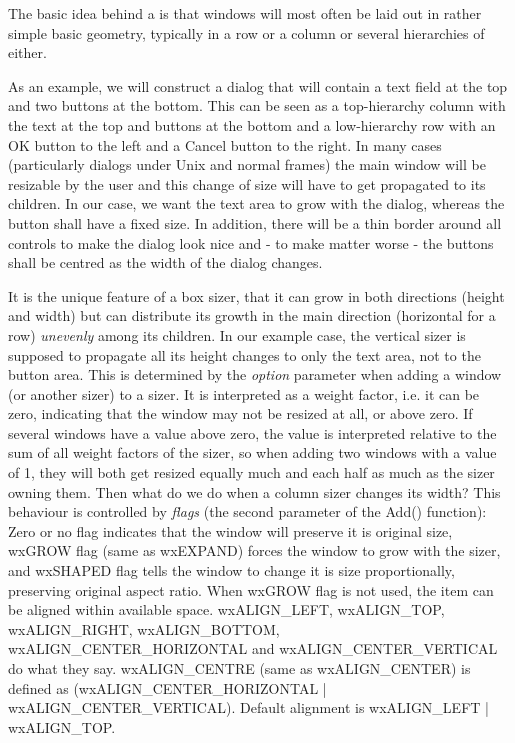 The basic idea behind a  is that windows will most often be laid out in rather
simple basic geometry, typically in a row or a column or several hierarchies of either.

As an example, we will construct a dialog that will contain a text field at the top and
two buttons at the bottom. This can be seen as a top-hierarchy column with the text at
the top and buttons at the bottom and a low-hierarchy row with an OK button to the left
and a Cancel button to the right. In many cases (particularly dialogs under Unix and
normal frames) the main window will be resizable by the user and this change of size
will have to get propagated to its children. In our case, we want the text area to grow
with the dialog, whereas the button shall have a fixed size. In addition, there will be
a thin border around all controls to make the dialog look nice and - to make matter worse -
the buttons shall be centred as the width of the dialog changes.

It is the unique feature of a box sizer, that it can grow in both directions (height and
width) but can distribute its growth in the main direction (horizontal for a row) {\it unevenly} 
among its children. In our example case, the vertical sizer is supposed to propagate all its
height changes to only the text area, not to the button area. This is determined by the {\it option} parameter
when adding a window (or another sizer) to a sizer. It is interpreted
as a weight factor, i.e. it can be zero, indicating that the window may not be resized
at all, or above zero. If several windows have a value above zero, the value is interpreted
relative to the sum of all weight factors of the sizer, so when adding two windows with
a value of 1, they will both get resized equally much and each half as much as the sizer
owning them. Then what do we do when a column sizer changes its width? This behaviour is
controlled by {\it flags} (the second parameter of the Add() function): Zero or no flag
indicates that the window will preserve it is original size, wxGROW flag (same as wxEXPAND)
forces the window to grow with the sizer, and wxSHAPED flag tells the window to change it is
size proportionally, preserving original aspect ratio.  When wxGROW flag is not used,
the item can be aligned within available space.  wxALIGN\_LEFT, wxALIGN\_TOP, wxALIGN\_RIGHT,
wxALIGN\_BOTTOM, wxALIGN\_CENTER\_HORIZONTAL and wxALIGN\_CENTER\_VERTICAL do what they say.
wxALIGN\_CENTRE (same as wxALIGN\_CENTER) is defined as (wxALIGN\_CENTER\_HORIZONTAL |
wxALIGN\_CENTER\_VERTICAL).  Default alignment is wxALIGN\_LEFT | wxALIGN\_TOP.

